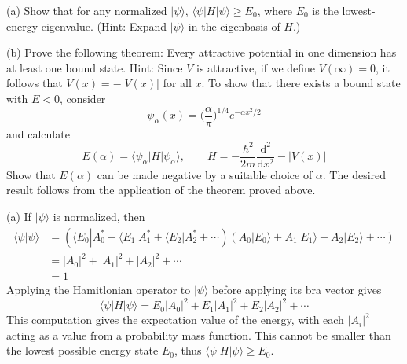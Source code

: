 \documentclass[../principles-of-quantum-mechanics.tex]{subfiles}
\begin{document}
\begin{questions}
	\question (a) Show that for any normalized $|\psi\rangle$, $\langle\psi|H|\psi\rangle \geq E_0$, where $E_0$ is the lowest-energy eigenvalue. (Hint: Expand $|\psi\rangle$ in the eigenbasis of $H$.)
	
	(b) Prove the following theorem: Every attractive potential in one dimension has at least one bound state. Hint: Since $V$ is attractive, if we define $V(\infty)=0$, it follows that $V(x) = -|V(x)|$ for all $x$. To show that there exists a bound state with $E<0$, consider
	$$\psi_\alpha(x) = \Big(\frac{\alpha}{\pi}\Big)^{1/4}e^{-\alpha x^2/2}$$
	and calculate
	$$E(\alpha) = \langle\psi_\alpha|H|\psi_\alpha\rangle, \qquad H = -\frac{\hbar^2}{2m}\frac{\mathrm{d}^2}{\mathrm{d}x^2}-|V(x)|$$
	Show that $E(\alpha)$ can be made negative by a suitable choice of $\alpha$. The desired result follows from the application of the theorem proved above.
	
	\begin{solution}
		(a) If $|\psi\rangle$ is normalized, then 
		\begin{align*}
			\langle \psi|\psi\rangle &= (\langle E_0|A_0^* + \langle E_1|A_1^* + \langle E_2|A_2^* + \cdots)(A_0|E_0\rangle + A_1|E_1\rangle + A_2|E_2\rangle + \cdots) \\
			&= |A_0|^2 + |A_1|^2 + |A_2|^2 + \cdots \\
			&= 1
		\end{align*}
		Applying the Hamitlonian operator to $|\psi\rangle$ before applying its bra vector gives
		$$\langle \psi|H|\psi\rangle = E_0|A_0|^2 + E_1|A_1|^2 + E_2|A_2|^2 + \cdots$$
		This computation gives the expectation value of the energy, with each $|A_i|^2$ acting as a value from a probability mass function. This cannot be smaller than the lowest possible energy state $E_0$, thus $\langle\psi|H|\psi\rangle \geq E_0$.
		

\end{solution}
\end{questions}
\end{document}
